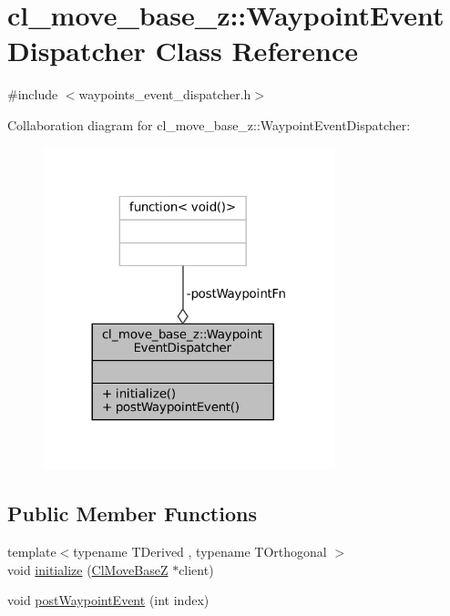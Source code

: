 \hypertarget{classcl__move__base__z_1_1WaypointEventDispatcher}{}\section{cl\+\_\+move\+\_\+base\+\_\+z\+:\+:Waypoint\+Event\+Dispatcher Class Reference}
\label{classcl__move__base__z_1_1WaypointEventDispatcher}


{\ttfamily \#include $<$waypoints\+\_\+event\+\_\+dispatcher.\+h$>$}



Collaboration diagram for cl\+\_\+move\+\_\+base\+\_\+z\+:\+:Waypoint\+Event\+Dispatcher\+:
\nopagebreak
\begin{figure}[H]
\begin{center}
\leavevmode
\includegraphics[width=240pt]{classcl__move__base__z_1_1WaypointEventDispatcher__coll__graph}
\end{center}
\end{figure}
\subsection*{Public Member Functions}
\begin{DoxyCompactItemize}
\item 
{\footnotesize template$<$typename T\+Derived , typename T\+Orthogonal $>$ }\\void \hyperlink{classcl__move__base__z_1_1WaypointEventDispatcher_a89674461d32af85dd64ca49290dbd010}{initialize} (\hyperlink{classcl__move__base__z_1_1ClMoveBaseZ}{Cl\+Move\+BaseZ} $\ast$client)
\item 
void \hyperlink{classcl__move__base__z_1_1WaypointEventDispatcher_a6462eae610b97df2207ecd93c1544aaf}{post\+Waypoint\+Event} (int index)
\end{DoxyCompactItemize}
